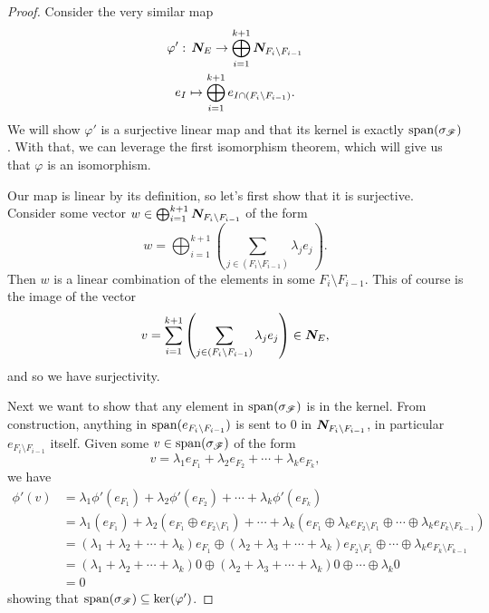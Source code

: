\documentclass[12pt,oneside]{../../sfsuthesis}
\begin{document}
\begin{proof}
    Consider the very similar map
    \begin{gather*}
        \varphi':\, \bm{N}_E \to \bigoplus_{i=1}^{k+1} \bm{N}_{F_i \setminus F_{i-1}} \\
        e_I \mapsto \bigoplus_{i=1}^{k+1} e_{I \cap (F_i \setminus F_{i-1})}.
    \end{gather*}
    We will show \( \varphi' \) is a surjective linear map and that its kernel is exactly \( \operatorname{span}(\sigma_{\mathscr{F}})  \).
    With that, we can leverage the first isomorphism theorem, which will give us that \( \varphi \) is an isomorphism.

    Our map is linear by its definition, so let's first show that it is surjective.
    Consider some vector \( w \in  \bigoplus_{i=1}^{k+1} \bm{N}_{F_i \setminus F_{i-1}}\) of the form
    \[
        w = \bigoplus_{i=1}^{k+1} \left( \sum_{j \in (F_i \setminus F_{i-1} )} \lambda_j e_j \right).
    \]
    Then \( w \) is a linear combination of the elements in some \( F_i \setminus F_{i-1} \).
    This of course is the image of the vector
    \[
        v = \sum_{i=1}^{k+1} \left( \sum_{j \in (F_i \setminus F_{i-1} )} \lambda_j e_j \right) \in \bm{N}_E,
    \]
    and so we have surjectivity.

    Next we want to show that any element in \( \operatorname{span}(\sigma_{\mathscr{F}}) \) is in the kernel.
    From construction, anything in \( \operatorname{span}( e_{F_i \setminus F_{i-1}}) \) is sent to 0 in \( \bm{N}_{F_i \setminus F_{i-1}} \), in particular \( e_{F_i \setminus F_{i-1}} \) itself.
    Given some \( v \in \operatorname{span}( \sigma_{\mathscr{F}} ) \) of the form
    \[
        v = \lambda_1 e_{F_1} + \lambda_2 e_{F_2} + \cdots + \lambda_k e_{F_k},
    \]
    we have
    \begin{align*}
        \phi'(v) & = \lambda_1 \phi'(e_{F_1}) + \lambda_2 \phi'(e_{F_2}) + \cdots + \lambda_k \phi'(e_{F_k})                                                                                                                                                 \\
                 & = \lambda_1 \left(e_{F_1}\right) + \lambda_2 \left(e_{F_1} \oplus  e_{F_2 \setminus F_1}\right) + \cdots + \lambda_k \left(e_{F_1} \oplus \lambda_k e_{F_2 \setminus F_1} \oplus \cdots \oplus \lambda_k e_{F_k \setminus F_{k-1}}\right) \\
                 & = (\lambda_1 + \lambda_2 + \cdots + \lambda_k) e_{F_1} \oplus (\lambda_2 + \lambda_3 + \cdots + \lambda_k) e_{F_2 \setminus F_1} \oplus \cdots \oplus \lambda_k e_{F_k \setminus F_{k-1}}                                                 \\
                 & = (\lambda_1 + \lambda_2 + \cdots + \lambda_k) 0 \oplus (\lambda_2 + \lambda_3 + \cdots + \lambda_k) 0 \oplus \cdots \oplus \lambda_k 0                                                                                                   \\
                 & = 0
    \end{align*}
    showing that \( \operatorname{span}(\sigma_{\mathscr{F}}) \subseteq \ker(\varphi') \).


\end{proof}
\end{document}
